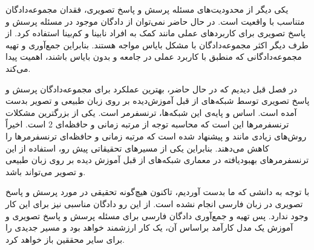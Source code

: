 یکی دیگر از محدودیت‌های مسئله پرسش و پاسخ تصویری، فقدان مجموعه‌دادگان متناسب با واقعیت است. در حال حاضر نمی‌توان از دادگان موجود در مسئله پرسش و پاسخ تصویری برای کاربرد‌های عملی مانند کمک به افراد نابینا و کم‌بینا استفاده کرد. از طرف دیگر اکثر مجموعه‌دادگان با مشکل بایاس مواجه هستند. بنابراین جمع‌آوری و تهیه مجموعه‌دادگانی که منطبق با کاربرد عملی در جامعه و بدون بایاس باشند، اهمیت پیدا می‌کند.

در فصل قبل دیدیم که در حال حاضر، بهترین عملکرد برای مجموعه‌دادگان پرسش و پاسخ تصویری توسط شبکه‌های از قبل آموزش‌دیده بر روی زبان طبیعی و تصویر بدست آمده است. اساس و پایه‌ی این شبکه‌ها، ترنسفرمر است. یکی از بزرگترین مشکلات ترنسفرمرها این است که محاسبه توجه از مرتبه زمانی و حافظه‌ای 2 است. اخیراً روش‌های زیادی مانند
\cite{Kitaev2020ReformerTE}
و
\cite{Choromanski2020RethinkingAW}
پیشنهاد شده است که مرتبه زمانی و حافظه‌ای ترنسفرمرها را کاهش می‌دهند. بنابراین یکی از مسیرهای تحقیقاتی پیش رو، استفاده از این ترنسفرمر‌های بهبودیافته در معماری شبکه‌های از قبل آموزش دیده بر روی زبان طبیعی و تصویر می‌تواند باشد.

با توجه به دانشی که ما بدست آوردیم، تاکنون هیچ‌گونه تحقیقی در مورد پرسش و پاسخ تصویری
در زبان فارسی انجام نشده است. از این رو دادگان مناسبی نیز برای این کار وجود ندارد. پس تهیه و جمع‌آوری دادگان فارسی برای مسئله پرسش و پاسخ تصویری و آموزش یک مدل کارآمد براساس آن، یک کار ارزشمند خواهد بود و مسیر جدیدی را برای سایر محققین باز خواهد کرد.


